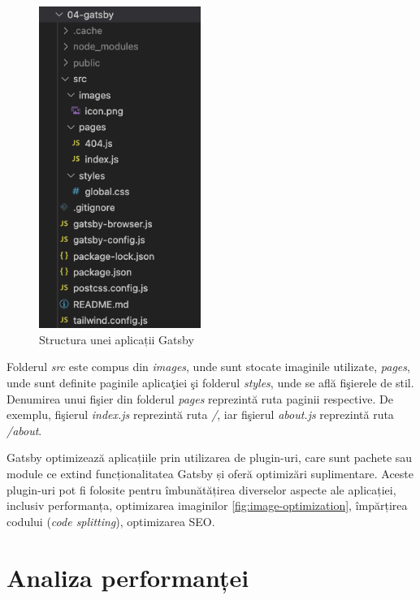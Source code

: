 \documentclass[12pt, a4paper]{report}
\begin{document}
\begin{figure}[htbp]
	\centering
	\includegraphics[width=0.47\textwidth]{gatsby_file_structure.png}
	\caption{Structura unei aplicații Gatsby}
	\label{fig:gatsby-structure}
\end{figure}

Folderul \textit{src} este compus din \textit{images}, unde sunt stocate imaginile utilizate, \textit{pages}, unde sunt definite paginile aplica\c tiei \c si folderul \textit{styles}, unde se afl\u a fi\c sierele de stil. Denumirea unui fi\c sier din folderul \textit{pages} reprezint\u a ruta paginii respective. De exemplu, fi\c sierul \textit{index.js} reprezint\u a ruta \textit{/}, iar fi\c sierul \textit{about.js} reprezint\u a ruta \textit{/about}.

Gatsby optimizează aplicațiile prin utilizarea de plugin-uri, care sunt pachete sau module ce extind funcționalitatea Gatsby și oferă optimizări suplimentare. Aceste plugin-uri pot fi folosite pentru îmbunătățirea diverselor aspecte ale aplicației, inclusiv performanța, optimizarea imaginilor \ref{fig:image-optimization}, împărțirea codului (\textit{code splitting}), optimizarea SEO.

\section{Analiza performanței}
\end{document}

